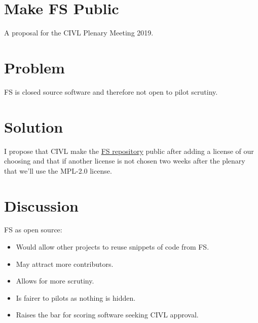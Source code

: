 \documentclass{article}
\begin{document}
\section*{Make FS Public}

A proposal for the CIVL Plenary Meeting 2019.

\section*{Problem}
FS is closed source software and therefore not open to pilot scrutiny.

\section*{Solution}
I propose that CIVL make the \href{https://github.com/FAI-CIVL/FS}{FS
repository} public after adding a license of our choosing and that if another
license is not chosen two weeks after the plenary that we'll use the MPL-2.0
license.

\section*{Discussion}
FS as open source:\\
\begin{itemize}
    \item Would allow other projects to reuse snippets of code from FS.
    \item May attract more contributors.
    \item Allows for more scrutiny.
    \item Is fairer to pilots as nothing is hidden.
    \item Raises the bar for scoring software seeking CIVL approval.
\end{itemize}
\end{document}
